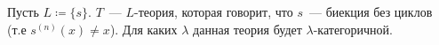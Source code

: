 Пусть $L \coloneqq \{s\}$. $T$~--- $L$-теория, которая говорит, что $s$~--- биекция без циклов (т.е
$s^{(n)}(x) \neq x$). Для каких $\lambda$ данная теория будет $\lambda$-категоричной.